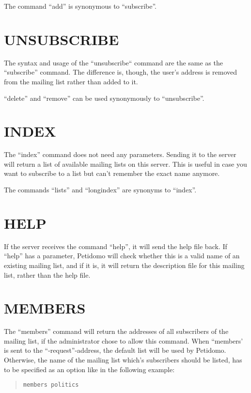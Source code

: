 \documentclass[a4paper,11pt]{scrreprt}
\begin{document}
The command ``add'' is synonymous to ``subscribe''.

\section{UNSUBSCRIBE}

The syntax and usage of the ``unsubscribe`` command are the same as the
``subscribe'' command. The difference is, though, the user's address
is removed from the mailing list rather than added to it.

``delete'' and ``remove'' can be used synonymously to ``unsubscribe''.

\section{INDEX}

The ``index'' command does not need any parameters. Sending it to the
server will return a list of available mailing lists on this server.
This is useful in case you want to subscribe to a list but can't
remember the exact name anymore.

The commands ``lists'' and ``longindex'' are synonyms to ``index''.

\section{HELP}

If the server receives the command ``help'', it will send the help
file back. If ``help'' has a parameter, Petidomo will check whether
this is a valid name of an existing mailing list, and if it is, it
will return the description file for this mailing list, rather than
the help file.

\section{MEMBERS}

The ``members'' command will return the addresses of all subscribers
of the mailing list, if the administrator chose to allow this command.
When ``members' is sent to the ``-request''-address, the default list
will be used by Petidomo. Otherwise, the name of the mailing list
which's subscribers should be listed, has to be specified as an option
like in the following example:
\begin{quote}
\begin{verbatim}
members politics
\end{verbatim}
\end{quote}
\end{document}
